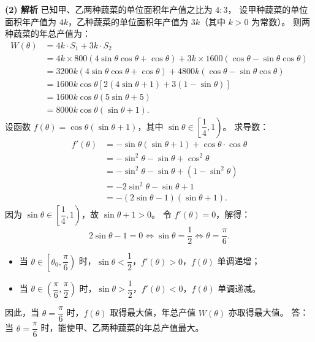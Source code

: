 \begin{answer}
\textbf{(2) 解析}
已知甲、乙两种蔬菜的单位面积年产值之比为 $4 : 3$，
设甲种蔬菜的单位面积年产值为 $4k$，乙种蔬菜的单位面积年产值为 $3k$（其中 $k > 0$ 为常数）。
则两种蔬菜的年总产值为：
\nopagebreak[4]
\[\begin{aligned}
W(\theta) &= 4k \cdot S_1 + 3k \cdot S_2 \\
&= 4k \times 800(4\sin\theta\cos\theta + \cos\theta) + 3k \times 1600(\cos\theta - \sin\theta\cos\theta) \\
&= 3200k(4\sin\theta\cos\theta + \cos\theta) + 4800k(\cos\theta - \sin\theta\cos\theta) \\
&= 1600k \cos\theta \left[2(4\sin\theta + 1) + 3(1 - \sin\theta)\right] \\
&= 1600k \cos\theta (5\sin\theta + 5) \\
&= 8000k \cos\theta (\sin\theta + 1).
\end{aligned}\]
设函数 $f(\theta) = \cos\theta(\sin\theta + 1)$，其中 $\sin\theta \in \left[\dfrac{1}{4}, 1\right)$。
求导数：
\nopagebreak[4]
\[\begin{aligned}
f'(\theta) &= -\sin\theta(\sin\theta + 1) + \cos\theta \cdot \cos\theta \\
&= -\sin^2\theta - \sin\theta + \cos^2\theta \\
&= -\sin^2\theta - \sin\theta + (1 - \sin^2\theta) \\
&= -2\sin^2\theta - \sin\theta + 1 \\
&= -(2\sin\theta - 1)(\sin\theta + 1).
\end{aligned}\]
因为 $\sin\theta \in \left[\dfrac{1}{4}, 1\right)$，故 $\sin\theta + 1 > 0$。
令 $f'(\theta) = 0$，解得：
\nopagebreak[4]
\[2\sin\theta - 1 = 0 \iff \sin\theta = \frac{1}{2} \iff \theta = \frac{\pi}{6}.\]
\begin{itemize}
\item 当 $\theta \in \left[\theta_0, \dfrac{\pi}{6}\right)$ 时，$\sin\theta < \dfrac{1}{2}$，$f'(\theta) > 0$，$f(\theta)$ 单调递增；
\item 当 $\theta \in \left(\dfrac{\pi}{6}, \dfrac{\pi}{2}\right)$ 时，$\sin\theta > \dfrac{1}{2}$，$f'(\theta) < 0$，$f(\theta)$ 单调递减。
\end{itemize}
因此，当 $\theta = \dfrac{\pi}{6}$ 时，$f(\theta)$ 取得最大值，年总产值 $W(\theta)$ 亦取得最大值。
答：当 $\theta = \dfrac{\pi}{6}$ 时，能使甲、乙两种蔬菜的年总产值最大。

\gkanswer{答案（1）：矩形 $ABCD$ 的面积为 $800(4\sin\theta\cos\theta+\cos\theta)$ 平方米，$\triangle CDP$ 的面积为 $1600(\cos\theta-\sin\theta\cos\theta)$ 平方米，$\sin\theta$ 的取值范围是 $\left[\dfrac{1}{4}, 1\right)$。}


\end{answer}
